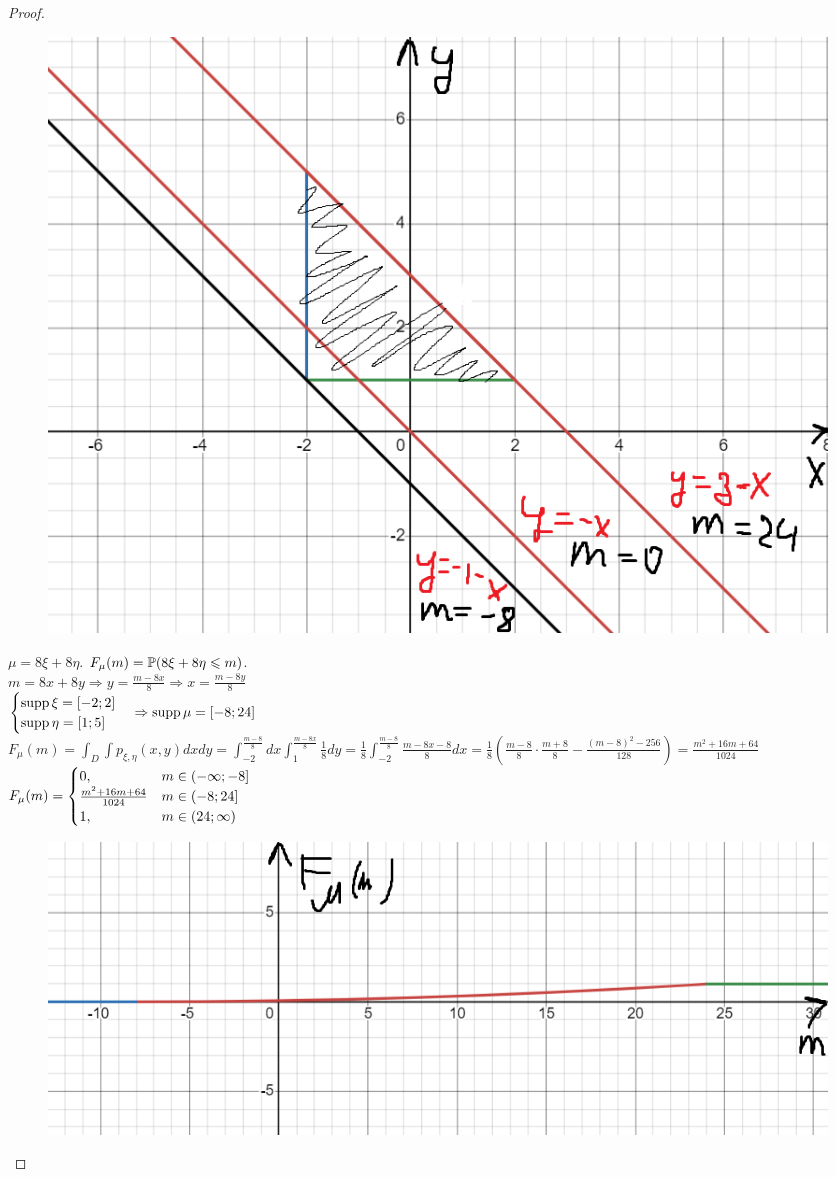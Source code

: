 \begin{proof}
\begin{figure}[H]
    \centering
    \includegraphics[width=0.5\linewidth]{3idz_5png.png}
    \caption{}
    \label{fig:enter-label}
\end{figure}
$\mu = 8\xi + 8\eta$. $F_{\mu}(m) = \mathbb P(8\xi + 8\eta\leqslant m)$.\\
$m = 8x + 8y \Rightarrow y = \frac{m-8x}{8} \Rightarrow x = \frac{m-8y}{8}$\\
$\begin{cases}
\operatorname{\mathop{supp}} \xi = [-2;2]\\
\operatorname{\mathop{supp}} \eta = [1;5]
\end{cases} \Rightarrow \operatorname{\mathop{supp}} \mu = [-8;24]$\\
$F_{\mu}(m) = \int_{D}\int p_{\xi, \eta}(x, y)dxdy = \int_{-2}^{\frac{m-8}{8}}dx \int_{1}^{\frac{m-8x}{8}}\frac{1}{8}dy = \frac{1}{8}\int_{-2}^{\frac{m-8}{8}}\frac{m-8x-8}{8}dx = \frac{1}{8}\left(\frac{m-8}{8}\cdot \frac{m+8}{8} - \frac{(m-8)^{2} - 256}{128}\right) = \frac{m^2 + 16m + 64}{1024}$\\
$\\
F_{\mu}(m) = \begin{cases}
    0, & m\in (-\infty;-8]\\
    \frac{m^2 + 16m + 64}{1024}& m\in (-8; 24]\\
    1, & m\in (24; \infty)
\end{cases}
$\\

\begin{figure}[H]
    \centering
    \includegraphics[width=0.5\linewidth]{3idz_6png.png}
    \caption{}
    \label{fig:enter-label}
\end{figure}
\end{proof}
